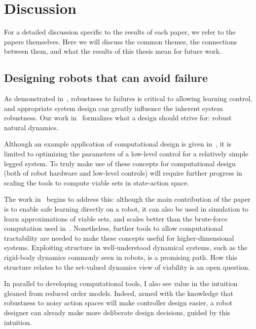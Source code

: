 
\chapter{Discussion}

For a detailed discussion specific to the results of each paper, we refer to the papers themselves. Here we will discuss the common themes, the connections between them, and what the results of this thesis mean for future work.

\section{Designing robots that can avoid failure}

As demonstrated in~\cite{heim2018shaping}, robustness to failures is critical to allowing learning control, and appropriate system design can greatly influence the inherent system robustness. Our work in~\cite{heim2019beyond} formalizes what a design should strive for: robust natural dynamics. \par
Although an example application of computational design is given in~\cite{heim2019beyond}, it is limited to optimizing the parameters of a low-level control for a relatively simple legged system. To truly make use of these concepts for computational design (both of robot hardware and low-level controls) will require further progress in scaling the tools to compute viable sets in state-action space. \par
The work in~\cite{heim2019learnable} begins to address this: although the main contribution of the paper is to enable safe learning directly on a robot, it can also be used in simulation to learn approximations of viable sets, and scales better than the brute-force computation used in~\cite{heim2019beyond}.
Nonetheless, further tools to allow computational tractability are needed to make these concepts useful for higher-dimensional systems. Exploiting structure in well-understood dynamical systems, such as the rigid-body dynamics commonly seen in robots, is a promising path. How this structure relates to the set-valued dynamics view of viability is an open question. \par
In parallel to developing computational tools, I also see value in the intuition gleaned from reduced order models. Indeed, armed with the knowledge that robustness to noisy action spaces will make controller design easier, a robot designer can already make more deliberate design decisions, guided by this intuition.


